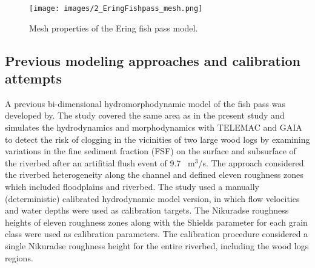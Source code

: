 \documentclass[draft,linenumbers,onecolumn]{agujournal2019} %
\begin{document}






\begin{figure}[!htbp]
	\centering
	\texttt{[image: images/2\_EringFishpass\_mesh.png]}
	\caption{Mesh properties of the Ering fish pass model.}
	\label{fig:Mesh}
\end{figure}

\subsection{Previous modeling approaches and calibration attempts}
\label{sec:Sec2.4}

A previous bi-dimensional hydromorphodynamic model of the fish pass was developed by. The study covered the same area as in the present study and simulates the hydrodynamics and morphodynamics with TELEMAC and GAIA to detect the risk of clogging in the vicinities of two large wood logs by examining variations in the fine sediment fraction (FSF) on the surface and subsurface of the riverbed after an artifitial flush event of 9.7 ~m$^3$/s.
The approach considered the riverbed heterogeneity along the channel and defined eleven roughness zones which included floodplains and riverbed. The study used a manually (deterministic) calibrated hydrodynamic model version, in which flow velocities and water depths were used as calibration targets. The Nikuradse roughness heights of eleven roughness zones along with the Shields parameter for each grain class were used as calibration parameters. The calibration procedure considered a single Nikuradse roughness height for the entire riverbed, including the wood logs regions. 
\end{document}
